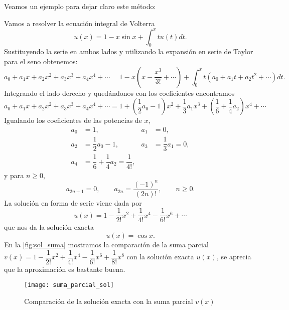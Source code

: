Veamos un ejemplo para dejar claro este método:
\begin{ejemplo}
	Vamos a resolver la ecuación integral de Volterra
	\begin{equation}
		u(x) = 1 - x \sin x + \int_{0}^{x} tu(t)dt.
	\end{equation}
	Sustituyendo la serie en ambos lados y utilizando la expansión en serie de Taylor para el seno obtenemos:
	\begin{equation}
		a_0 + a_1x + a_2x^2 + a_3x^3 + a_4x^4 +\cdots = 1 - x(x-\dfrac{x^3}{3!} + \cdots) + \int_{0}^{x}t(a_0+a_1t+a_2t^2+\cdots)dt.
	\end{equation}
	Integrando el lado derecho y quedándonos con los coeficientes encontramos
	\begin{equation}
		a_0 + a_1x + a_2x^2 + a_3x^3 + a_4x^4 + \cdots = 1+(\dfrac{1}{2}a_0-1)x^2+\dfrac{1}{3}a_1x^3+(\dfrac{1}{6}+\dfrac{1}{4}a_2)x^4+\cdots
	\end{equation}
	Igualando los coeficientes de las potencias de $x$,
	\begin{align}
		a_0&=1,          &  a_1&=0,      \\
		a_2&=\dfrac{1}{2}a_0-1,   &  a_3&=\dfrac{1}{3}a_1 = 0, \\
		a_4&=\dfrac{1}{6}+\dfrac{1}{4}a_2 = \dfrac{1}{4!},
	\end{align}
	y para $n\geqslant0$,
	\begin{equation}
		a_{2n+1} = 0, \qquad a_{2n} = \dfrac{(-1)^n}{(2n)!}, \qquad n \geqslant 0.
	\end{equation}
	La solución en forma de serie viene dada por
	\begin{equation}
		u(x) = 1 - \dfrac{1}{2!}x^2 + \dfrac{1}{4!}x^4-\dfrac{1}{6!}x^6+\cdots
	\end{equation}
	que nos da la solución exacta
	\begin{equation}
		u(x) = \cos x.
	\end{equation}
	En la \autoref{fig:sol_suma} mostramos la comparación de la suma parcial $v(x) = 1 - \dfrac{1}{2!}x^2 + \dfrac{1}{4!}x^4-\dfrac{1}{6!}x^6+\dfrac{1}{8!}x^8$ con la solución exacta $u(x)$, se aprecia que la aproximación es bastante buena.
	\begin{figure}[h!]
		\centering
		\texttt{[image: suma\_parcial\_sol]}
		\caption{Comparación de la solución exacta con la suma parcial $v(x)$}
		\label{fig:sol_suma}
	\end{figure}
\end{ejemplo}

